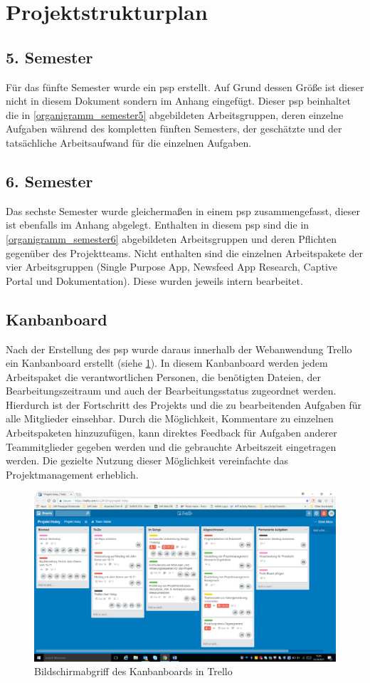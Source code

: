 \section{Projektstrukturplan}

\subsection{5. Semester}

Für das fünfte Semester wurde ein \gls{psp} erstellt. Auf Grund dessen Größe ist dieser nicht in diesem Dokument sondern im Anhang eingefügt. Dieser \gls{psp} beinhaltet die in \vref{organigramm_semester5} abgebildeten Arbeitsgruppen, deren einzelne Aufgaben während des kompletten fünften Semesters, der geschätzte und der tatsächliche Arbeitsaufwand für die einzelnen Aufgaben.

\subsection{6. Semester}

Das sechste Semester wurde gleichermaßen in einem \gls{psp} zusammengefasst, dieser ist ebenfalls im Anhang abgelegt. Enthalten in diesem \gls{psp} sind die in \vref{organigramm_semester6} abgebildeten Arbeitsgruppen und deren Pflichten gegenüber des Projektteams. Nicht enthalten sind die einzelnen Arbeitspakete der vier Arbeitsgruppen (Single Purpose App, Newsfeed App Research, Captive Portal und Dokumentation). Diese wurden jeweils intern bearbeitet.

\subsection{Kanbanboard}

Nach der Erstellung des \gls{psp} wurde daraus innerhalb der Webanwendung Trello ein Kanbanboard erstellt (siehe \ref{fig:frame:kanban}). In diesem Kanbanboard werden jedem Arbeitspaket die verantwortlichen Personen, die benötigten Dateien, der Bearbeitungszeitraum und auch der Bearbeitungsstatus zugeordnet werden. Hierdurch ist der Fortschritt des Projekts und die zu bearbeitenden Aufgaben für alle Mitglieder einsehbar. Durch die Möglichkeit, Kommentare zu einzelnen Arbeitspaketen hinzuzufügen, kann direktes Feedback für Aufgaben anderer Teammitglieder gegeben werden und die gebrauchte Arbeitszeit eingetragen werden. Die gezielte Nutzung dieser Möglichkeit vereinfachte das Projektmanagement erheblich.

\begin{figure}[H]
\centering
\includegraphics[width=1\textwidth]{images/trello}
\caption[Bildschirmabgriff des Kanbanboards in Trello]{Bildschirmabgriff des Kanbanboards in Trello}
\label{fig:frame:kanban}
\end{figure}
